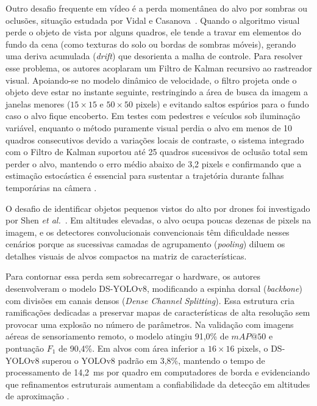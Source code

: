 Outro desafio frequente em vídeo é a perda momentânea do alvo por sombras ou oclusões, situação estudada por Vidal e Casanova~\cite{vidal2007}. Quando o algoritmo visual perde o objeto de vista por alguns quadros, ele tende a travar em elementos do fundo da cena (como texturas do solo ou bordas de sombras móveis), gerando uma deriva acumulada (\textit{drift}) que desorienta a malha de controle. Para resolver esse problema, os autores acoplaram um Filtro de Kalman recursivo ao rastreador visual. Apoiando-se no modelo dinâmico de velocidade, o filtro projeta onde o objeto deve estar no instante seguinte, restringindo a área de busca da imagem a janelas menores ($15 \times 15$ e $50 \times 50$ pixels) e evitando saltos espúrios para o fundo caso o alvo fique encoberto. Em testes com pedestres e veículos sob iluminação variável, enquanto o método puramente visual perdia o alvo em menos de 10 quadros consecutivos devido a variações locais de contraste, o sistema integrado com o Filtro de Kalman suportou até 25 quadros sucessivos de oclusão total sem perder o alvo, mantendo o erro médio abaixo de 3,2 pixels e confirmando que a estimação estocástica é essencial para sustentar a trajetória durante falhas temporárias na câmera \cite{vidal2007}.

O desafio de identificar objetos pequenos vistos do alto por drones foi investigado por Shen \textit{et al.}~\cite{shen2023}. Em altitudes elevadas, o alvo ocupa poucas dezenas de pixels na imagem, e os detectores convolucionais convencionais têm dificuldade nesses cenários porque as sucessivas camadas de agrupamento (\textit{pooling}) diluem os detalhes visuais de alvos compactos na matriz de características.

Para contornar essa perda sem sobrecarregar o hardware, os autores desenvolveram o modelo DS-YOLOv8, modificando a espinha dorsal (\textit{backbone}) com divisões em canais densos (\textit{Dense Channel Splitting}). Essa estrutura cria ramificações dedicadas a preservar mapas de características de alta resolução sem provocar uma explosão no número de parâmetros. Na validação com imagens aéreas de sensoriamento remoto, o modelo atingiu 91,0\% de $mAP@50$ e pontuação $F_1$ de 90,4\%. Em alvos com área inferior a $16 \times 16$ pixels, o DS-YOLOv8 superou o YOLOv8 padrão em 3,8\%, mantendo o tempo de processamento de 14,2~ms por quadro em computadores de borda e evidenciando que refinamentos estruturais aumentam a confiabilidade da detecção em altitudes de aproximação \cite{shen2023}.

